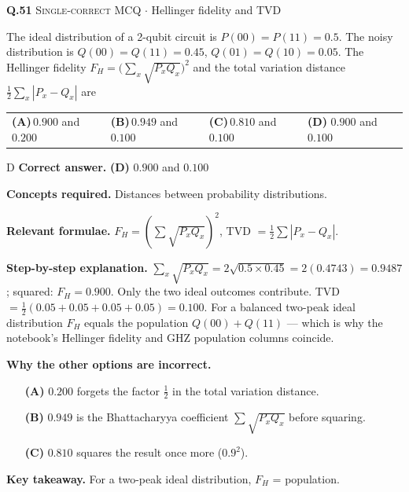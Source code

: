 \documentclass[11pt,a4paper]{article}
\newcommand{\optlabel}[1]{\textbf{(#1)}}
\newcommand{\correctlabel}[1]{\textcolor{okgreen}{\textbf{(#1)}\,\ding{51}}}
\newenvironment{qitem}[1]{\begin{list}{}{\setlength{\leftmargin}{3.3em}\setlength{\labelwidth}{3.1em}%
  \setlength{\labelsep}{0.2em}\setlength{\topsep}{3pt}\setlength{\parsep}{3pt}}\item[\textbf{Q.#1}\hfill]}{\end{list}}
\newcommand{\qsep}{\par\vspace{2pt}{\color{black!15}\hrule}\vspace{4pt}}
\newcommand{\qmeta}[2]{{\footnotesize\color{black!60}\textsc{#1} \;$\cdot$\; #2}\par}
\begin{document}
\begin{qitem}{51}
\qmeta{Single-correct MCQ}{Hellinger fidelity and TVD}
The ideal distribution of a 2-qubit circuit is $P(00) = P(11) = 0.5$. The noisy distribution is $Q(00) = Q(11) = 0.45$, $Q(01) = Q(10) = 0.05$. The Hellinger
fidelity $F_H = \big(\sum_x\sqrt{P_xQ_x}\big)^2$ and the total variation distance $\frac12\sum_x|P_x - Q_x|$ are
\par\smallskip\noindent\begin{tabularx}{\linewidth}{@{}*{4}{L}@{}}
\optlabel{A}\,$0.900$ and $0.200$ & \optlabel{B}\,$0.949$ and $0.100$ & \optlabel{C}\,$0.810$ and $0.100$ & \correctlabel{D}\,$0.900$ and $0.100$
\end{tabularx}
\end{qitem}
\begin{solbox}{D}
\textbf{\color{brand}Correct answer.} \textcolor{okgreen}{\textbf{(D)}} $0.900$ and $0.100$

\textbf{\color{brand}Concepts required.} Distances between probability distributions.

\textbf{\color{brand}Relevant formulae.} $F_H = (\sum\sqrt{P_xQ_x})^2$, TVD $= \frac12\sum|P_x - Q_x|$.

\textbf{\color{brand}Step-by-step explanation.} $\sum_x\sqrt{P_xQ_x} = 2\sqrt{0.5\times0.45} = 2(0.4743) = 0.9487$; squared: $F_H = 0.900$. Only the two ideal outcomes contribute.
TVD $= \frac12(0.05 + 0.05 + 0.05 + 0.05) = 0.100$. For a balanced two-peak ideal distribution $F_H$ equals the population $Q(00) + Q(11)$ --- which is why the
notebook's Hellinger fidelity and GHZ population columns coincide.

\textbf{\color{brand}Why the other options are incorrect.}
\begin{itemize}[leftmargin=2.4em, itemsep=1pt, topsep=2pt]
\item[\textbf{(A)}] $0.200$ forgets the factor $\frac12$ in the total variation distance.
\item[\textbf{(B)}] $0.949$ is the Bhattacharyya coefficient $\sum\sqrt{P_xQ_x}$ before squaring.
\item[\textbf{(C)}] $0.810$ squares the result once more ($0.9^2$).
\end{itemize}
\textbf{\color{brand}Key takeaway.} For a two-peak ideal distribution, $F_H$ = population.
\end{solbox}
\qsep
\end{document}
